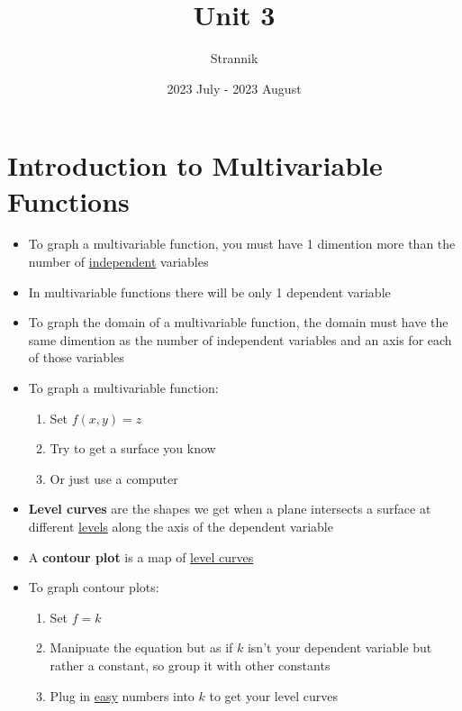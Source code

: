 \documentclass{article}
\title{Unit 3}
\author{Strannik}
\date{2023 July - 2023 August}
\begin{document}
\maketitle
\section{Introduction to Multivariable Functions}
\begin{itemize}
  \item To graph a multivariable function, you must have 1 dimention more than the number of \underline{independent} variables
  \item In multivariable functions there will be only 1 dependent variable
  \item To graph the domain of a multivariable function, the domain must have the same dimention as the number of independent variables and an axis for each of those variables
  \item To graph a multivariable function:
  \begin{enumerate}
    \item Set $f(x,y) = z$
    \item Try to get a surface you know
    \item Or just use a computer
  \end{enumerate}
  \item \textbf{Level curves} are the shapes we get when a plane intersects a surface at different \underline{levels} along the axis of the dependent variable
  \item A \textbf{contour plot} is a map of \underline{level curves}
  \item To graph contour plots:
  \begin{enumerate}
    \item Set $f = k$
    \item Manipuate the equation but as if $k$ isn't your dependent variable but rather a constant, so group it with other constants
    \item Plug in \underline{easy} numbers into $k$ to get your level curves
  \end{enumerate}
\end{itemize}
\end{document}
